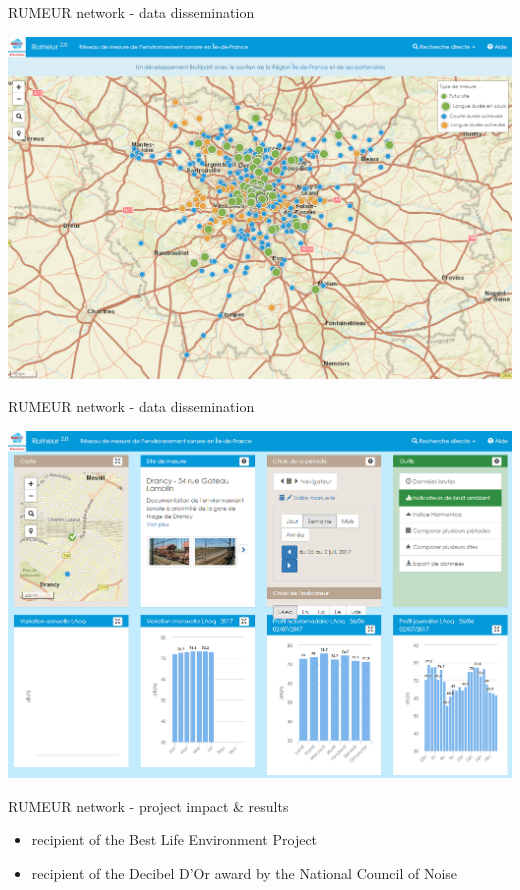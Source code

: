 \documentclass{beamer}
\begin{document}
    \begin{frame}{RUMEUR network - data dissemination}         
        \begin{center}
            \includegraphics[scale=0.28]{figures/rumeur2}
        \end{center}
    \end{frame}
    
    \begin{frame}{RUMEUR network - data dissemination}         
        \begin{center}
            \includegraphics[scale=0.28]{figures/rumeur1}
        \end{center}
    \end{frame}
    
    \begin{frame}{RUMEUR network - project impact \& results}
        \begin{itemize}
            \item recipient of the Best Life Environment Project  
            \item recipient of the Decibel D'Or award by the National Council of Noise
        \end{itemize}
    \end{frame}
\end{document}
